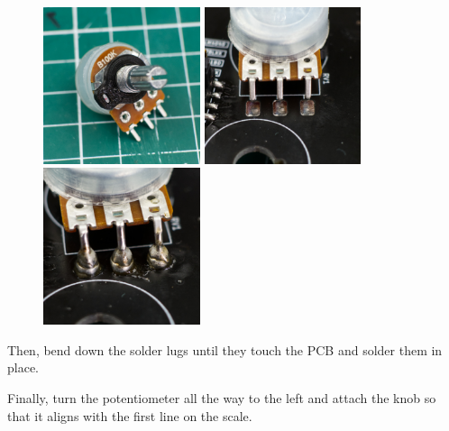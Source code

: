 \documentclass[12pt, a4paper]{article}
\begin{document}
\begin{figure}[H]
    \centering
    \includegraphics[width=46mm]{images/section_3-4_washer.jpg}
    \hspace{2mm}
    \includegraphics[width=46mm]{images/section_3-4_screwed.jpg}
    \hspace{2mm}
    \includegraphics[width=46mm]{images/section_3-4_solder_stack.jpg}
\end{figure}

Then, bend down the solder lugs until they touch the PCB and solder them in place.

Finally, turn the potentiometer all the way to the left and attach the knob so that it aligns
with the first line on the scale.
\end{document}
